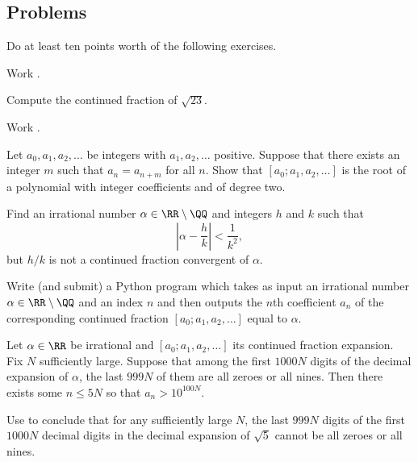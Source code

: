 \documentclass[../notes.tex]{subfiles}
\begin{document}
\subsection{Problems}
Do at least ten points worth of the following exercises.
\begin{prob}[2 points]
	Work .
\end{prob}
\begin{prob}[2 points]
	Compute the continued fraction of $\sqrt{23}$.
\end{prob}
\begin{prob}[3 points]
	Work .
\end{prob}
\begin{prob}[3 points]
	Let $a_0,a_1,a_2,\ldots$ be integers with $a_1,a_2,\ldots$ positive. Suppose that there exists an integer $m$ such that $a_n=a_{n+m}$ for all $n$. Show that $[a_0;a_1,a_2,\ldots]$ is the root of a polynomial with integer coefficients and of degree two.
\end{prob}
\begin{prob}[4 points]
	Find an irrational number $\alpha\in\RR\setminus\QQ$ and integers $h$ and $k$ such that
	\[\left|\alpha-\frac hk\right|<\frac1{k^2},\]
	but $h/k$ is not a continued fraction convergent of $\alpha$.
\end{prob}
\begin{prob}[5 points]
	Write (and submit) a Python program which takes as input an irrational number $\alpha\in\RR\setminus\QQ$ and an index $n$ and then outputs the $n$th coefficient $a_n$ of the corresponding continued fraction $[a_0;a_1,a_2,\ldots]$ equal to $\alpha$.
\end{prob}
\begin{prob}[8 points] \label{prob:not-too-many-nines}
	Let $\alpha\in\RR$ be irrational and $[a_0;a_1,a_2,\ldots]$ its continued fraction expansion. Fix $N$ sufficiently large. Suppose that among the first $1000N$ digits of the decimal expansion of $\alpha$, the last $999N$ of them are all zeroes or all nines. Then there exists some $n\le5N$ so that $a_n>10^{100N}$.
\end{prob}
\begin{prob}[2 points]
	Use  to conclude that for any sufficiently large $N$, the last $999N$ digits of the first $1000N$ decimal digits in the decimal expansion of $\sqrt5$ cannot be all zeroes or all nines.
\end{prob}
\end{document}
